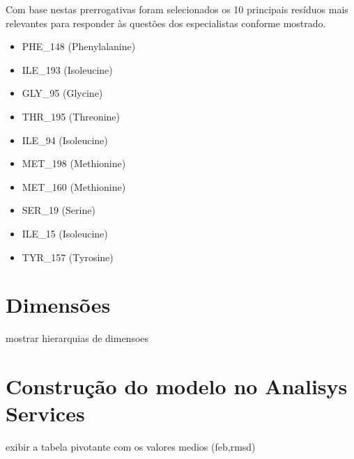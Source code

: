 Com base nestas prerrogativas foram selecionados os 10 principais resíduos mais relevantes para responder às questões dos especialistas conforme mostrado.

\begin{itemize}
	\item PHE\_148 (Phenylalanine)
	\item ILE\_193 (Isoleucine)
	\item GLY\_95 (Glycine)
	\item THR\_195 (Threonine)
	\item ILE\_94 (Isoleucine)
	\item MET\_198 (Methionine)
	\item MET\_160 (Methionine)
	\item SER\_19 (Serine)
	\item ILE\_15 (Isoleucine)
	\item TYR\_157 (Tyrosine)
\end{itemize}


\section{Dimensões}
	mostrar hierarquias de dimensoes
	
\section{Construção do modelo no Analisys Services}
	exibir a tabela pivotante com os valores medios (feb,rmsd)
